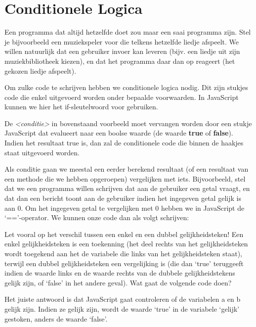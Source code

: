 \chapter{Conditionele Logica}
Een programma dat altijd hetzelfde doet zou maar een saai programma zijn.
Stel je bijvoorbeeld een muziekspeler voor die telkens hetzelfde liedje afspeelt.
We willen natuurlijk dat een gebruiker invoer kan leveren (bijv. een liedje uit zijn
muziekbibliotheek kiezen), en dat het programma daar dan op reageert (het gekozen liedje afspeelt).

Om zulke code te schrijven hebben we conditionele logica nodig. Dit zijn stukjes code die enkel uitgevoerd worden onder bepaalde voorwaarden. In JavaScript kunnen we hier het if-sleutelwoord voor gebruiken.


De \emph{<conditie>} in bovenstaand voorbeeld moet vervangen worden door een stukje JavaScript dat evalueert naar een boolse waarde (de waarde \textbf{true} of \textbf{false}). Indien het resultaat true is, dan zal de conditionele code die binnen de haakjes staat uitgevoerd worden.

Als conditie gaan we meestal een eerder berekend resultaat (of een resultaat van een methode die we hebben opgeroepen) vergelijken met iets. Bijvoorbeeld, stel dat we een programma willen schrijven dat aan de gebruiker een getal vraagt, en dat dan een bericht toont aan de gebruiker indien het ingegeven getal gelijk is aan 0. Om het ingegeven getal te vergelijken met 0 hebben we in JavaScript de `=='-operator. We kunnen onze code dan als volgt schrijven:


Let vooral op het verschil tussen een enkel en een dubbel gelijkheidsteken! Een enkel gelijkheidsteken is een toekenning (het deel rechts van het gelijkheidsteken wordt toegekend aan het de variabele die links van het gelijkheidsteken staat), terwijl een dubbel gelijkheidsteken een vergelijking is (die dan `true' teruggeeft indien de waarde links en de waarde rechts van de dubbele gelijkheidstekens gelijk zijn, of `false' in het andere geval). Wat gaat de volgende code doen?


Het juiste antwoord is dat JavaScript gaat controleren of de variabelen a en b gelijk zijn. Indien ze gelijk zijn, wordt de waarde `true' in de variabele `gelijk' gestoken, anders de waarde `false'.

